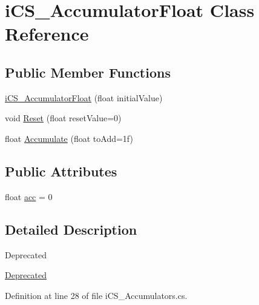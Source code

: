 \hypertarget{classi_c_s___accumulator_float}{\section{i\+C\+S\+\_\+\+Accumulator\+Float Class Reference}
\label{classi_c_s___accumulator_float}
}
\subsection*{Public Member Functions}
\begin{DoxyCompactItemize}
\item 
\hyperlink{classi_c_s___accumulator_float_ab1825024f421a6445ff61418a6b96bd6}{i\+C\+S\+\_\+\+Accumulator\+Float} (float initial\+Value)
\item 
void \hyperlink{classi_c_s___accumulator_float_adec7f080dd945b504ffc12d3163674a3}{Reset} (float reset\+Value=0)
\item 
float \hyperlink{classi_c_s___accumulator_float_a5f6d101bb81dbc731b47943056227c64}{Accumulate} (float to\+Add=1f)
\end{DoxyCompactItemize}
\subsection*{Public Attributes}
\begin{DoxyCompactItemize}
\item 
float \hyperlink{classi_c_s___accumulator_float_a08d21e38773f42f96485a5b5540523fd}{acc} = 0
\end{DoxyCompactItemize}


\subsection{Detailed Description}
\begin{DoxyRefDesc}{Deprecated}
\item[\hyperlink{deprecated__deprecated000002}{Deprecated}]\end{DoxyRefDesc}


Definition at line 28 of file i\+C\+S\+\_\+\+Accumulators.\+cs.



